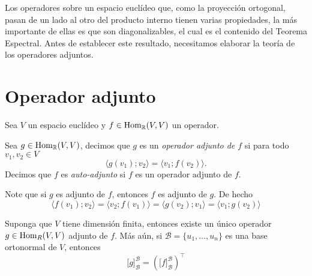 \begin{obs}
Los operadores sobre un espacio eucl\'ideo que, como la proyecci\'on ortogonal, pasan de un lado al otro del producto interno tienen varias propiedades, la m\'as importante de ellas es que son diagonalizables, el cual es el contenido del Teorema Espectral. Antes de establecer este resultado, necesitamos elaborar la teor\'ia de los operadores adjuntos.
\end{obs}

\section{Operador adjunto}

Sea $V$ un espacio eucl\'ideo y $f\in\operatorname{Hom}_\mathbb{R}(V,V)$ un operador.

\begin{defn}
Sea $g\in\operatorname{Hom}_\mathbb{R}(V,V)$, decimos que $g$ es un \emph{operador adjunto de $f$} si para todo $v_1,v_2\in V$
\[
\langle g(v_1);v_2 \rangle=\langle v_1;f(v_2)\rangle.
\]
Decimos que $f$ es \emph{auto-adjunto} si $f$ es un operador adjunto de $f$. 
\end{defn}

\begin{obs}
Note que si $g$ es adjunto de $f$, entonces $f$ es adjunto de $g$. De hecho
\[
\langle f(v_1);v_2\rangle= \langle v_2;f(v_1)\rangle= \langle g(v_2);v_1\rangle= \langle v_1;g(v_2)\rangle
\]
\end{obs}

\begin{prop}\label{adjtras}
Suponga que $V$ tiene dimensi\'on finita, entonces existe un \'unico operador $g\in\operatorname{Hom}_{R}(V,V)$ adjunto de $f$. M\'as a\'un, si $\mathcal{B}=\{u_1,\ldots,u_n\}$ es una base ortonormal de $V$, entonces
\[
\Big[g\Big]^\mathcal{B}_\mathcal{B}=\left(\Big[f\Big]^\mathcal{B}_\mathcal{B}\right)^\intercal
\]
\end{prop}

